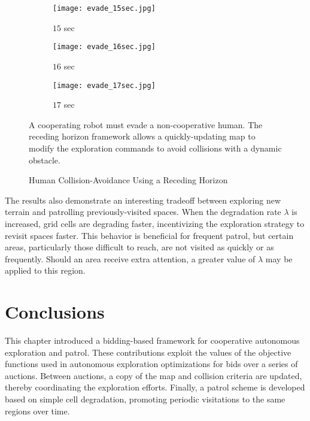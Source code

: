 \begin{figure}[!t]
\centering
    	\begin{subfigure}[t]{0.3\columnwidth}
           	\centering
          	\texttt{[image: evade\_15sec.jpg]}
        		\caption{$15$ sec}
    	\end{subfigure}
	\hspace*{0.02\textwidth}
    	\begin{subfigure}[t]{0.3\columnwidth}
           	\centering
          	\texttt{[image: evade\_16sec.jpg]}
        		\caption{$16$ sec}
    	\end{subfigure}
	\hspace*{0.02\textwidth}
    	\begin{subfigure}[t]{0.3\columnwidth}
           	\centering
          	\texttt{[image: evade\_17sec.jpg]}
        		\caption{$17$ sec}
    	\end{subfigure}
	\caption{Human Collision-Avoidance Using a Receding Horizon}
	\medskip
	\small
	A cooperating robot must evade a non-cooperative human. The receding horizon framework allows a quickly-updating map to modify the exploration commands to avoid collisions with a dynamic obstacle.
	\label{fig:EvadeHuman}
\end{figure}

The results also demonstrate an interesting tradeoff between exploring new terrain and patrolling previously-visited spaces. When the degradation rate $\lambda$ is increased, grid cells are degrading faster, incentivizing the exploration strategy to revisit spaces faster. This behavior is beneficial for frequent patrol, but certain areas, particularly those difficult to reach, are not visited as quickly or as frequently. Should an area receive extra attention, a greater value of $\lambda$ may be applied to this region.



\section{Conclusions}

This chapter introduced a bidding-based framework for cooperative autonomous exploration and patrol. These contributions exploit the values of the objective functions used in autonomous exploration optimizations for bids over a series of auctions. Between auctions, a copy of the map and collision criteria are updated, thereby coordinating the exploration efforts. Finally, a patrol scheme is developed based on simple cell degradation, promoting periodic visitations to the same regions over time.



